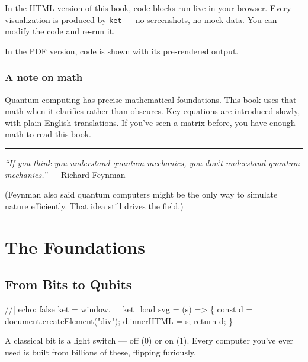 \documentclass[
  11pt,
  letterpaper,
  oneside]{scrbook}
\newenvironment{Shaded}{\begin{snugshade}}{\end{snugshade}}
\newcommand{\NormalTok}[1]{\textcolor[rgb]{0.00,0.23,0.31}{#1}}
\begin{document}

In the HTML version of this book, code blocks run live in your browser.
Every visualization is produced by \texttt{ket} --- no screenshots, no
mock data. You can modify the code and re-run it.

In the PDF version, code is shown with its pre-rendered output.

\section*{A note on math}\label{a-note-on-math}


Quantum computing has precise mathematical foundations. This book uses
that math when it clarifies rather than obscures. Key equations are
introduced slowly, with plain-English translations. If you've seen a
matrix before, you have enough math to read this book.

\begin{center}\rule{0.5\linewidth}{0.5pt}\end{center}

\emph{``If you think you understand quantum mechanics, you don't
understand quantum mechanics.''} --- Richard Feynman

(Feynman also said quantum computers might be the only way to simulate
nature efficiently. That idea still drives the field.)

\part{The Foundations}

\chapter{From Bits to Qubits}\label{sec-bits}

\begin{Shaded}
\begin{Highlighting}[]
\NormalTok{//| echo: false}
\NormalTok{ket = window.\_\_ket\_load}
\NormalTok{svg = (s) =\textgreater{} \{ const d = document.createElement("div"); d.innerHTML = s; return d; \}}
\end{Highlighting}
\end{Shaded}

A classical bit is a light switch --- off (0) or on (1). Every computer
you've ever used is built from billions of these, flipping furiously.
\end{document}
